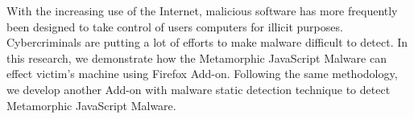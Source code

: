 With the increasing use of the Internet, malicious software has more frequently been designed to take control of users computers for illicit purposes. Cybercriminals are putting a lot of efforts to make malware difficult to detect. In this research, we demonstrate how the Metamorphic JavaScript Malware can effect victim's machine using Firefox Add-on. Following the same methodology, we develop another Add-on with malware static detection technique to detect Metamorphic JavaScript Malware.